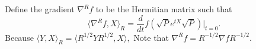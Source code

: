 \documentclass{article}
\newcommand\tr{\operatorname{Tr}}
\begin{document}
Define the gradient $\nabla^R f$ to be the Hermitian matrix such that 
$$ \langle \nabla^R f, X \rangle_R = \frac{d}{dt } f(\sqrt{P} e^{tX} \sqrt{P}) |_{t = 0}.$$ 
Because $\langle Y, X \rangle_R = \langle R^{1/2} YR^{1/2}, X \rangle,$
Note that $\nabla^R f = R^{-1/2} \nabla f R^{-1/2}$. 




\end{document}
